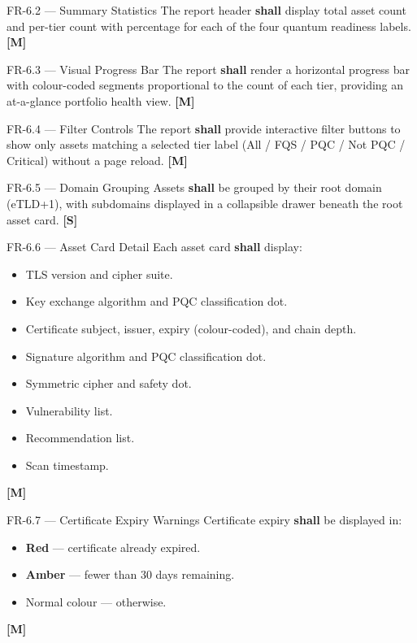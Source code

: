 \begin{reqbox}{FR-6.2 — Summary Statistics}
  The report header \textbf{shall} display total asset count and per-tier count
  with percentage for each of the four quantum readiness labels. \hfill \textbf{[M]}
\end{reqbox}

\begin{reqbox}{FR-6.3 — Visual Progress Bar}
  The report \textbf{shall} render a horizontal progress bar with colour-coded
  segments proportional to the count of each tier, providing an at-a-glance
  portfolio health view. \hfill \textbf{[M]}
\end{reqbox}

\begin{reqbox}{FR-6.4 — Filter Controls}
  The report \textbf{shall} provide interactive filter buttons to show only assets
  matching a selected tier label (All / FQS / PQC / Not PQC / Critical) without
  a page reload. \hfill \textbf{[M]}
\end{reqbox}

\begin{reqbox}{FR-6.5 — Domain Grouping}
  Assets \textbf{shall} be grouped by their root domain (eTLD+1), with subdomains
  displayed in a collapsible drawer beneath the root asset card. \hfill \textbf{[S]}
\end{reqbox}

\begin{reqbox}{FR-6.6 — Asset Card Detail}
  Each asset card \textbf{shall} display:
  \begin{itemize}[noitemsep]
    \item TLS version and cipher suite.
    \item Key exchange algorithm and PQC classification dot.
    \item Certificate subject, issuer, expiry (colour-coded), and chain depth.
    \item Signature algorithm and PQC classification dot.
    \item Symmetric cipher and safety dot.
    \item Vulnerability list.
    \item Recommendation list.
    \item Scan timestamp.
  \end{itemize}
  \hfill \textbf{[M]}
\end{reqbox}

\begin{reqbox}{FR-6.7 — Certificate Expiry Warnings}
  Certificate expiry \textbf{shall} be displayed in:
  \begin{itemize}[noitemsep]
    \item \textcolor{critical}{\textbf{Red}} — certificate already expired.
    \item \textcolor{notpqc}{\textbf{Amber}} — fewer than 30 days remaining.
    \item Normal colour — otherwise.
  \end{itemize}
  \hfill \textbf{[M]}
\end{reqbox}

